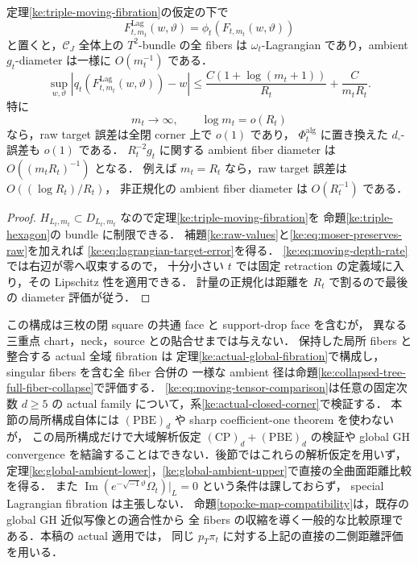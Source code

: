\begin{corollary}
\label{ke:closed-corner-fibration}
定理\ref{ke:triple-moving-fibration}の仮定の下で
\[
 F_{t,m_t}^{\mathrm{Lag}}(w,\vartheta)
 =\phi_t(F_{t,m_t}(w,\vartheta))
\]
と置くと，$\mathcal C_J$ 全体上の $T^2$-bundle の全 fibers は
$\omega_t$-Lagrangian であり，ambient $g_t$-diameter は一様に $O(m_t^{-1})$ である．
\begin{equation}\label{ke:eq:lagrangian-target-error}
 \sup_{w,\vartheta}
 |q_t(F_{t,m_t}^{\mathrm{Lag}}(w,\vartheta))-w|
 \le\frac{C(1+\log(m_t+1))}{R_t}
      +\frac{C}{m_tR_t}.
\end{equation}
特に
\begin{equation}\label{ke:eq:moving-depth-rate}
 m_t\longrightarrow\infty,\qquad \log m_t=o(R_t)
\end{equation}
なら，raw target 誤差は全閉 corner 上で $o(1)$ であり，
$\Phi_t^{\mathrm{alg}}$ に置き換えた $d_\square$-誤差も $o(1)$ である．
$R_t^{-2}g_t$ に関する ambient fiber diameter は $O((m_tR_t)^{-1})$ となる．
例えば $m_t=R_t$ なら，raw target 誤差は $O((\log R_t)/R_t)$，
非正規化の ambient fiber diameter は $O(R_t^{-1})$ である．
\end{corollary}
\begin{proof}
$H_{L_t,m_t}\subset D_{L_t,m_t}$ なので定理\ref{ke:triple-moving-fibration}を
命題\ref{ke:triple-hexagon}の bundle に制限できる．
補題\ref{ke:raw-values}と\eqref{ke:eq:moser-preserves-raw}を加えれば
\eqref{ke:eq:lagrangian-target-error}を得る．
\eqref{ke:eq:moving-depth-rate}では右辺が零へ収束するので，
十分小さい $t$ では固定 retraction の定義域に入り，その Lipschitz 性を適用できる．
計量の正規化は距離を $R_t$ で割るので最後の diameter 評価が従う．
\end{proof}

\begin{remark}[局所結論の論理的範囲]\label{ke:local-scope}
この構成は三枚の閉 square の共通 face と support-drop face を含むが，
異なる三重点 chart，neck，source との貼合せまでは与えない．
保持した局所 fibers と整合する actual 全域 fibration は
定理\ref{ke:actual-global-fibration}で構成し，singular fibers を含む全 fiber 合併の
一様な ambient 径は命題\ref{ke:collapsed-tree-full-fiber-collapse}で評価する．
\eqref{ke:eq:moving-tensor-comparison}は任意の固定次数 $d\ge5$ の actual family について，系\ref{ke:actual-closed-corner}で検証する．
本節の局所構成自体には $\mathrm{(PBE)}_d$ や sharp coefficient-one theorem を使わないが，
この局所構成だけで大域解析仮定 $\mathrm{(CP)}_d+\mathrm{(PBE)}_d$ の検証や
global GH convergence を結論することはできない．後節ではこれらの解析仮定を用いず，
定理\ref{ke:global-ambient-lower}，\ref{ke:global-ambient-upper}で直接の全曲面距離比較を得る．
また $\operatorname{Im}(e^{-\sqrt{-1}\vartheta}\Omega_t)|_L=0$ という条件は課しておらず，
special Lagrangian fibration は主張しない．
命題\ref{topo:ke-map-compatibility}は，既存の global GH 近似写像との適合性から
全 fibers の収縮を導く一般的な比較原理である．本稿の actual 適用では，
同じ $p_T\pi_t$ に対する上記の直接の二側距離評価を用いる．
\end{remark}


